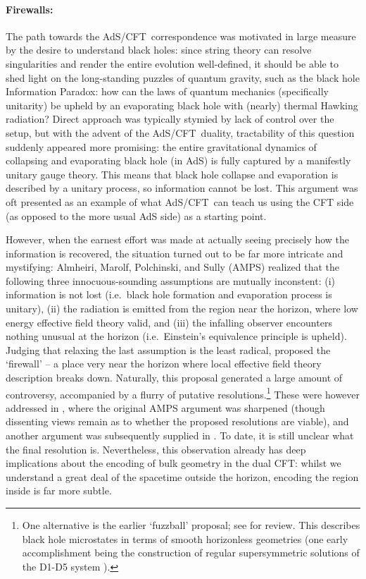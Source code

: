 \documentclass[12pt]{article}
\def\AC{AdS/CFT}
\def\QG{quantum gravity}
\begin{document}
\paragraph{Firewalls:}  %
The path towards the \AC\ correspondence was motivated in large measure by the desire to understand black holes: since string theory can resolve singularities and render the entire evolution  well-defined, it should be able to shed light on the long-standing puzzles of \QG, such as the black hole Information Paradox: how can the laws of quantum mechanics (specifically unitarity) be upheld by an evaporating black hole with (nearly) thermal Hawking radiation?  Direct approach was typically stymied by lack of control over the setup, but with the advent of the \AC\ duality, tractability of this question suddenly appeared more promising: the entire gravitational dynamics of collapsing and evaporating black hole (in AdS) is fully captured by a manifestly unitary gauge theory.  This means that black hole collapse and evaporation is described by a unitary process, so information cannot be lost.  This argument was oft presented as an example of what \AC\ can teach us using the CFT side (as opposed to the more usual AdS side) as a starting point.  

However, when the earnest effort was made at actually seeing precisely how the information is recovered, the situation turned out to be far more intricate and mystifying:  Almheiri, Marolf, Polchinski, and Sully (AMPS)  \cite{Almheiri:2012rt} realized that the following three innocuous-sounding assumptions are mutually inconstent: (i) information is not lost (i.e.\ black hole formation and evaporation process is unitary), (ii) the radiation is emitted from the region near the horizon, where low energy effective field theory valid, and (iii) the infalling observer encounters nothing unusual at the horizon (i.e.\ Einstein's equivalence principle is upheld).  Judging that relaxing the last assumption is the least radical, \cite{Almheiri:2012rt} proposed the `firewall' -- a place very near the horizon where local effective field theory description breaks down.  Naturally, this proposal generated a large amount of controversy, accompanied by a flurry of putative resolutions.\footnote{
One alternative is the earlier `fuzzball' proposal; see \cite{Mathur:2008nj} for review.  This describes black hole microstates in terms of smooth horizonless geometries (one early accomplishment being the construction of regular supersymmetric solutions of the D1-D5 system \cite{Lunin:2002iz}).
}  These were however addressed in 
\cite{Almheiri:2013hfa}, where the original AMPS argument was sharpened  (though dissenting views remain as to whether the proposed resolutions are viable), and another argument was subsequently supplied in 
\cite{Marolf:2013dba}.  To date, it is still unclear what the final resolution is.   
Nevertheless, this observation already has deep implications about the encoding of bulk geometry in the dual CFT:  whilst we understand a great deal of the spacetime outside the horizon, encoding the region inside is far more subtle.
\end{document}
